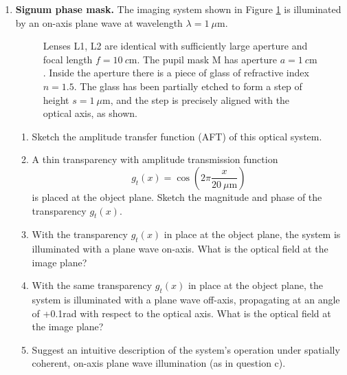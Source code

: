 \documentclass[main.tex]{subfiles}
\begin{document}
\begin{enumerate}
\item{\textbf{Signum phase mask.} The imaging system shown in Figure \ref{fig:f1} is illuminated by an on-axis plane wave at wavelength $\lambda=\SI{1}{\mu \meter}$. }


\begin{figure}
\centering{}
\caption{Lenses L1, L2 are identical with sufficiently large aperture and focal length $f=\SI{10}{c\metre}$. The pupil mask M has aperture $a=\SI{1}{c\metre}$. Inside the aperture there is a piece of glass of refractive index $n=1.5$. The glass has been partially etched to form a step of height $s=\SI{1}{\mu \metre}$, and the step is precisely aligned with the optical axis, as shown.}
\label{fig:f1}
\end{figure}

\begin{enumerate}
\item{Sketch the amplitude transfer function (AFT) of this optical system.}

\item{A thin transparency with amplitude transmission function}
$$g_t(x)=\cos \left( 2\pi \frac{x}{\SI{20}{\mu \metre} } \right)$$ 
is placed at the object plane. Sketch the magnitude and phase of the transparency $g_t(x)$.

\item{With the transparency $g_t(x)$ in place at the object plane, the system is illuminated with a plane wave on-axis. What is the optical field at the image plane?}

\item{With the same transparency $g_t(x)$ in place at the object plane, the system is illuminated with a plane wave off-axis, propagating at an angle of +0.1rad with respect to the optical axis. What is the optical field at the image plane?}

\item{Suggest an intuitive description of the system's operation under spatially coherent, on-axis plane wave illumination (as in question c)}.


\end{enumerate}

\end{enumerate}
\end{document}
